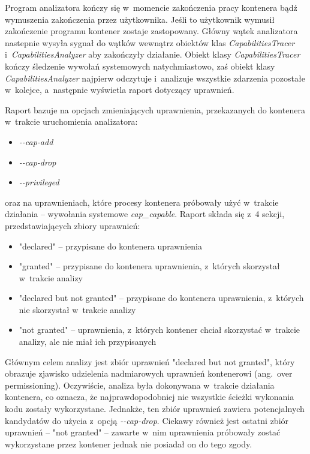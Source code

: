 Program analizatora kończy się w~momencie zakończenia pracy kontenera bądź wymuszenia zakończenia przez użytkownika. Jeśli to użytkownik wymusił zakończenie programu kontener zostaje zastopowany. Główny wątek analizatora nastepnie wysyła sygnał do wątków wewnątrz obiektów klas \textit{CapabilitiesTracer} i~\textit{CapabilitiesAnalyzer} aby zakończyły działanie. Obiekt klasy \textit{CapabilitiesTracer} kończy śledzenie wywołań systemowych natychmiastowo, zaś obiekt klasy \textit{CapabilitiesAnalyzer} najpierw odczytuje i~analizuje wszystkie zdarzenia pozostałe w~kolejce, a~następnie wyświetla raport dotyczący uprawnień.

Raport bazuje na opcjach zmieniających uprawnienia, przekazanych do kontenera w~trakcie uruchomienia analizatora:
\begin{itemize}
    \item \textit{-{}-cap-add}
    \item \textit{-{}-cap-drop}
    \item \textit{-{}-privileged}
\end{itemize}
oraz na uprawnieniach, które procesy kontenera próbowały użyć w~trakcie działania -- wywołania systemowe \textit{cap_capable}. Raport składa się z~4 sekcji, przedstawiających zbiory uprawnień:
\begin{itemize}
    \item "declared" -- przypisane do kontenera uprawnienia
    \item "granted" -- przypisane do kontenera uprawnienia, z~których skorzystał w~trakcie analizy
    \item "declared but not granted" -- przypisane do kontenera uprawnienia, z~których nie skorzystał w~trakcie analizy
    \item "not granted" -- uprawnienia, z~których kontener chciał skorzystać w~trakcie analizy, ale nie miał ich przypisanych
\end{itemize}

Głównym celem analizy jest zbiór uprawnień "declared but not granted", który obrazuje zjawisko udzielenia nadmiarowych uprawnień kontenerowi (ang.~over permissioning). Oczywiście, analiza była dokonywana w~trakcie działania kontenera, co oznacza, że najprawdopodobniej nie wszystkie ścieżki wykonania kodu zostały wykorzystane. Jednakże, ten zbiór uprawnień zawiera potencjalnych kandydatów do użycia z~opcją \textit{-{}-cap-drop}. Ciekawy również jest ostatni zbiór uprawnień -- "not granted" -- zawarte w~nim uprawnienia próbowały zostać wykorzystane przez kontener jednak nie posiadał on do tego zgody.

